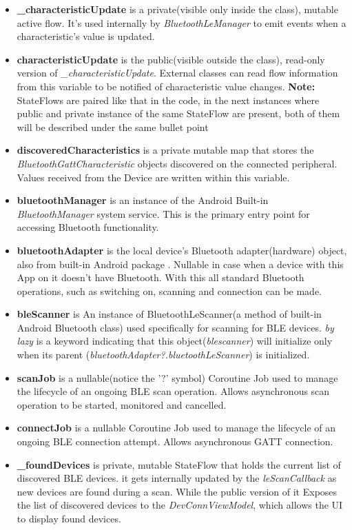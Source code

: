 \begin{itemize}
	\item \textbf{\_characteristicUpdate} is a private(visible only inside the class), mutable active flow. It's used internally by \textit{BluetoothLeManager} to emit events when a characteristic's value is updated.
	\item \textbf{characteristicUpdate} is the public(visible outside the class), read-only version of \textit{\_characteristicUpdate}. External classes can read flow information from this variable to be notified of characteristic value changes. \textbf{Note:} StateFlows are paired like that in the code, in the next instances where public and private instance of the same StateFlow are present, both of them will be described under the same bullet point
	\item \textbf{discoveredCharacteristics} is a private mutable map that stores the \textit{BluetoothGattCharacteristic} objects discovered on the connected peripheral. Values received from the Device are written within this variable.
	\item \textbf{bluetoothManager} is an instance of the Android Built-in \textit{BluetoothManager} system service\cite{android_bluetooth}. This is the primary entry point for accessing Bluetooth functionality.
	\item \textbf{bluetoothAdapter} is the local device's Bluetooth adapter(hardware) object, also from built-in Android package \cite{android_bluetooth}. Nullable in case when a device with this App on it doesn't have Bluetooth. With this all standard Bluetooth operations, such as switching on, scanning and  connection can be made.
	\item \textbf{bleScanner} is An instance of BluetoothLeScanner(a method of built-in Android Bluetooth class) used specifically for scanning for \ac{BLE} devices. \textit{by lazy} is a keyword indicating that this object(\textit{blescanner}) will initialize only when its parent (\textit{bluetoothAdapter?.bluetoothLeScanner})  is initialized.
	\item \textbf{scanJob} is a nullable(notice the '?' symbol) Coroutine Job used to manage the lifecycle of an ongoing BLE scan operation. Allows asynchronous scan operation to be started, monitored and cancelled.
	\item \textbf{connectJob} is a nullable Coroutine Job used to manage the lifecycle of an ongoing \ac{BLE} connection attempt. Allows asynchronous \ac{GATT} connection.
	\item \textbf{\_foundDevices} is private, mutable StateFlow that holds the current list of discovered \ac{BLE} devices. it gets internally updated by the \textit{leScanCallback} as new devices are found during a scan. While the public version of it Exposes the list of discovered devices to the \textit{DevConnViewModel}, which allows the UI to display found devices.

\end{itemize}
